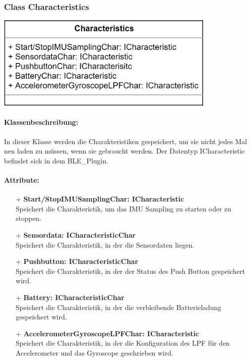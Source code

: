 \documentclass[a4paper,12pt]{article}
\begin{document}
\begin{minipage}[b]{0.5\textwidth}
	\subsubsection{Class Characteristics}
	
	\end{minipage}
	\begin{minipage}[c]{0.5\textwidth}
	\includegraphics[width=0.8\textwidth]{bilder/BibPackageKlassen/Characteristics.png}
\end{minipage}
\paragraph{Klassenbeschreibung:}
In dieser Klasse werden die Charakteristiken gespeichert, um sie nicht jedes Mal neu laden zu müssen, wenn sie gebraucht werden. Der Datentyp ICharacteristic befindet sich in dem BLE\_Plugin.

\paragraph{Attribute:}
\begin{itemize}
	\item[+] \textbf{Start/StopIMUSamplingChar: ICharacteristic}\\Speichert die Charakteristik, um das IMU Sampling zu starten oder zu stoppen.
	\item[+] \textbf{Sensordata: ICharacteristicChar}\\Speichert die Charakteristik, in der die Sensordaten liegen.
	\item[+] \textbf{Pushbutton: ICharacteristicChar}\\Speichert die Charakteristik, in der der Status des Push Button gespeichert wird.
	\item[+] \textbf{Battery: ICharacteristicChar}\\Speichert die Charakteristik, in der die verbleibende Batterieladung gespeichert wird.
	\item[+] \textbf{AccelerometerGyroscopeLPFChar: ICharacteristic}\\Speichert die Charakteristik, in der die Konfiguration des LPF für den Accelerometer und das Gyroscope geschrieben wird.
\end{itemize}
\end{document}
